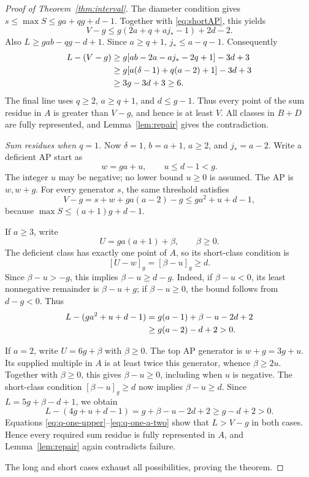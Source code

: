 \documentclass[11pt]{article}
\theoremstyle{definition}
\theoremstyle{remark}
\begin{document}
\begin{proof}[Proof of Theorem~\ref{thm:interval}]
The diameter condition gives
$s\leq\max S\leq ga+qg+d-1$. Together with
\eqref{eq:shortAP}, this yields
\[
 V-g\leq g(2a+q+aj_*-1)+2d-2.
\]
Also $L\geq gab-qg-d+1$. Since $a\geq q+1$,
$j_*\leq a-q-1$. Consequently
\begin{align}
 L-(V-g)
 &\geq g[ab-2a-aj_*-2q+1]-3d+3\notag\\
 &\geq g[a(\delta-1)+q(a-2)+1]-3d+3\notag\\
 &\geq 3g-3d+3\geq6.\label{eq:q-large-threshold}
\end{align}
The final line uses $q\geq2$, $a\geq q+1$, and $d\leq g-1$.
Thus every point of the sum residue in $A$ is greater than $V-g$,
and hence is at least $V$. All classes in $B+D$ are fully represented,
and Lemma~\ref{lem:repair} gives the contradiction.

\medskip
\noindent\emph{Sum residues when $q=1$.}
Now $\delta=1$, $b=a+1$, $a\geq2$, and $j_*=a-2$. Write a deficient
AP start as
\[
 w=ga+u,\qquad u\leq d-1<g.
\]
The integer $u$ may be negative; no lower bound $u\geq0$ is assumed.
The AP is $w,w+g$. For every generator $s$, the same threshold satisfies
\begin{equation}\label{eq:q-one-upper}
 V-g=s+w+ga(a-2)-g\leq ga^2+u+d-1,
\end{equation}
because $\max S\leq(a+1)g+d-1$.

If $a\geq3$, write
\[
 U=ga(a+1)+\beta,\qquad\beta\geq0.
\]
The deficient class has exactly one point of $A$, so its short-class
condition is
\[
 [U-w]_g=[\beta-u]_g\geq d.
\]
Since $\beta-u>-g$, this implies $\beta-u\geq d-g$. Indeed,
if $\beta-u<0$, its least nonnegative remainder is $\beta-u+g$;
if $\beta-u\geq0$, the bound follows from $d-g<0$. Thus
\begin{align}
 L-(ga^2+u+d-1)
 &=g(a-1)+\beta-u-2d+2\notag\\
 &\geq g(a-2)-d+2>0.\label{eq:q-one-a-large}
\end{align}

If $a=2$, write $U=6g+\beta$ with $\beta\geq0$. The top AP generator
is $w+g=3g+u$. Its supplied multiple in $A$ is at least twice this
generator, whence $\beta\geq2u$. Together with $\beta\geq0$, this
gives $\beta-u\geq0$, including when $u$ is negative. The short-class
condition $[\beta-u]_g\geq d$ now implies $\beta-u\geq d$. Since
$L=5g+\beta-d+1$, we obtain
\begin{equation}\label{eq:q-one-a-two}
 L-(4g+u+d-1)=g+\beta-u-2d+2\geq g-d+2>0.
\end{equation}
Equations \eqref{eq:q-one-upper}--\eqref{eq:q-one-a-two} show that
$L>V-g$ in both cases. Hence every required sum residue is fully
represented in $A$, and Lemma~\ref{lem:repair} again contradicts
failure.

The long and short cases exhaust all possibilities, proving the theorem.
\end{proof}
\end{document}
